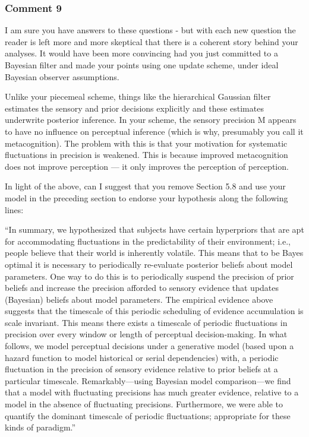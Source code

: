 \documentclass[
]{article}
\begin{document}
\hypertarget{comment-9}{%
\subsubsection{Comment 9}\label{comment-9}}

I am sure you have answers to these questions - but with each new
question the reader is left more and more skeptical that there is a
coherent story behind your analyses. It would have been more convincing
had you just committed to a Bayesian filter and made your points using
one update scheme, under ideal Bayesian observer assumptions.

Unlike your piecemeal scheme, things like the hierarchical Gaussian
filter estimates the sensory and prior decisions explicitly and these
estimates underwrite posterior inference. In your scheme, the sensory
precision M appears to have no influence on perceptual inference (which
is why, presumably you call it metacognition). The problem with this is
that your motivation for systematic fluctuations in precision is
weakened. This is because improved metacognition does not improve
perception --- it only improves the perception of perception.

In light of the above, can I suggest that you remove Section 5.8 and use
your model in the preceding section to endorse your hypothesis along the
following lines:

``In summary, we hypothesized that subjects have certain hyperpriors
that are apt for accommodating fluctuations in the predictability of
their environment; i.e., people believe that their world is inherently
volatile. This means that to be Bayes optimal it is necessary to
periodically re-evaluate posterior beliefs about model parameters. One
way to do this is to periodically suspend the precision of prior beliefs
and increase the precision afforded to sensory evidence that updates
(Bayesian) beliefs about model parameters. The empirical evidence above
suggests that the timescale of this periodic scheduling of evidence
accumulation is scale invariant. This means there exists a timescale of
periodic fluctuations in precision over every window or length of
perceptual decision-making. In what follows, we model perceptual
decisions under a generative model (based upon a hazard function to
model historical or serial dependencies) with, a periodic fluctuation in
the precision of sensory evidence relative to prior beliefs at a
particular timescale. Remarkably---using Bayesian model comparison---we
find that a model with fluctuating precisions has much greater evidence,
relative to a model in the absence of fluctuating precisions.
Furthermore, we were able to quantify the dominant timescale of periodic
fluctuations; appropriate for these kinds of paradigm.''
\end{document}
